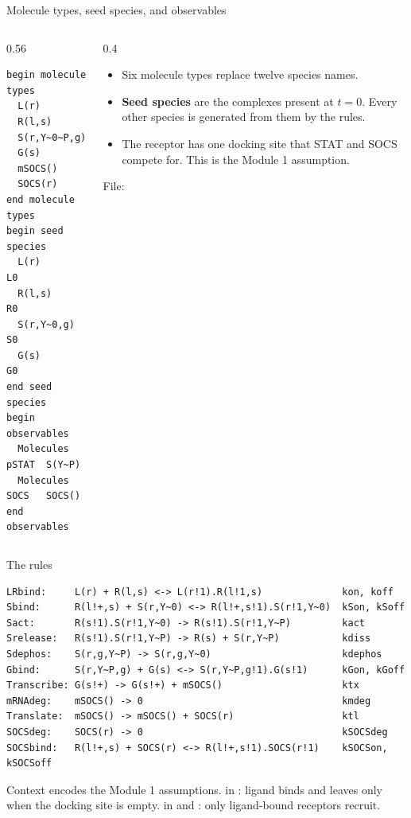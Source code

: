 \documentclass[aspectratio=169,10pt,t]{beamer}
\begin{document}
\begin{frame}[fragile]{Molecule types, seed species, and observables}
  \begin{columns}[T]
    \begin{column}{0.56\textwidth}
\begin{lstlisting}[language=bngl,basicstyle=\ttfamily\footnotesize]
begin molecule types
  L(r)
  R(l,s)
  S(r,Y~0~P,g)
  G(s)
  mSOCS()
  SOCS(r)
end molecule types
begin seed species
  L(r)        L0
  R(l,s)      R0
  S(r,Y~0,g)  S0
  G(s)        G0
end seed species
begin observables
  Molecules pSTAT  S(Y~P)
  Molecules SOCS   SOCS()
end observables
\end{lstlisting}
    \end{column}
    \begin{column}{0.4\textwidth}
      \small
      \begin{itemize}
        \setlength\itemsep{1.5mm}
        \item<2-> Six molecule types replace twelve species names.
        \item<3-> \textbf{Seed species} are the complexes present at $t=0$. Every other species
              is generated from them by the rules.
        \item<4-> The receptor has one docking site  that STAT and SOCS compete for.
              This is the Module 1 assumption.
      \end{itemize}
      \vskip1mm
      {\scriptsize File: }
    \end{column}
  \end{columns}
\end{frame}

\begin{frame}[fragile]{The rules}
\begin{lstlisting}[language=bngl,basicstyle=\ttfamily\footnotesize]
LRbind:     L(r) + R(l,s) <-> L(r!1).R(l!1,s)              kon, koff
Sbind:      R(l!+,s) + S(r,Y~0) <-> R(l!+,s!1).S(r!1,Y~0)  kSon, kSoff
Sact:       R(s!1).S(r!1,Y~0) -> R(s!1).S(r!1,Y~P)         kact
Srelease:   R(s!1).S(r!1,Y~P) -> R(s) + S(r,Y~P)           kdiss
Sdephos:    S(r,g,Y~P) -> S(r,g,Y~0)                       kdephos
Gbind:      S(r,Y~P,g) + G(s) <-> S(r,Y~P,g!1).G(s!1)      kGon, kGoff
Transcribe: G(s!+) -> G(s!+) + mSOCS()                     ktx
mRNAdeg:    mSOCS() -> 0                                   kmdeg
Translate:  mSOCS() -> mSOCS() + SOCS(r)                   ktl
SOCSdeg:    SOCS(r) -> 0                                   kSOCSdeg
SOCSbind:   R(l!+,s) + SOCS(r) <-> R(l!+,s!1).SOCS(r!1)    kSOCSon, kSOCSoff
\end{lstlisting}
  {\small Context encodes the Module 1 assumptions.  in : ligand
  binds and leaves only when the docking site is empty.  in 
  and : only ligand-bound receptors recruit.}
\end{frame}
\end{document}
